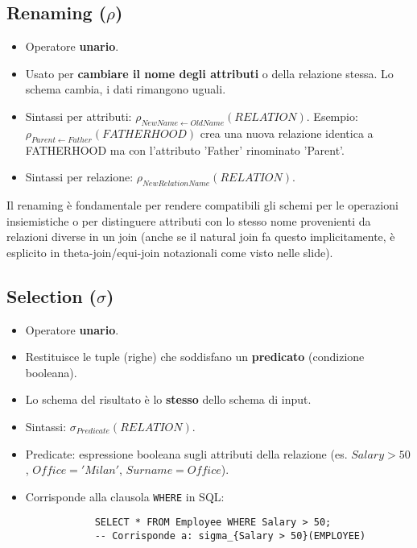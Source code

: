 \documentclass{article}
\newcommand{\rename}[2]{\rho_{#1}(#2)}
\newcommand{\selectop}[2]{\sigma_{#1}(#2)}
\begin{document}
	\subsection{Renaming ($\rho$)}
	\begin{itemize}
		\item Operatore \textbf{unario}.
		\item Usato per \textbf{cambiare il nome degli attributi} o della relazione stessa. Lo schema cambia, i dati rimangono uguali.
		\item Sintassi per attributi: $\rename{NewName \leftarrow OldName}{RELATION}$. Esempio: $\rename{Parent \leftarrow Father}{FATHERHOOD}$ crea una nuova relazione identica a FATHERHOOD ma con l'attributo 'Father' rinominato 'Parent'.
		\item Sintassi per relazione: $\rename{NewRelationName}{RELATION}$.
	\end{itemize}
	Il renaming è fondamentale per rendere compatibili gli schemi per le operazioni insiemistiche o per distinguere attributi con lo stesso nome provenienti da relazioni diverse in un join (anche se il natural join fa questo implicitamente, è esplicito in theta-join/equi-join notazionali come visto nelle slide).
	
	\subsection{Selection ($\sigma$)}
	\begin{itemize}
		\item Operatore \textbf{unario}.
		\item Restituisce le tuple (righe) che soddisfano un \textbf{predicato} (condizione booleana).
		\item Lo schema del risultato è lo \textbf{stesso} dello schema di input.
		\item Sintassi: $\selectop{Predicate}{RELATION}$.
		\item Predicate: espressione booleana sugli attributi della relazione (es. $Salary > 50$, $Office = 'Milan'$, $Surname = Office$).
		\item Corrisponde alla clausola \texttt{WHERE} in SQL:
		\begin{verbatim}
			SELECT * FROM Employee WHERE Salary > 50;
			-- Corrisponde a: sigma_{Salary > 50}(EMPLOYEE)
		\end{verbatim}
	\end{itemize}
	
\end{document}
